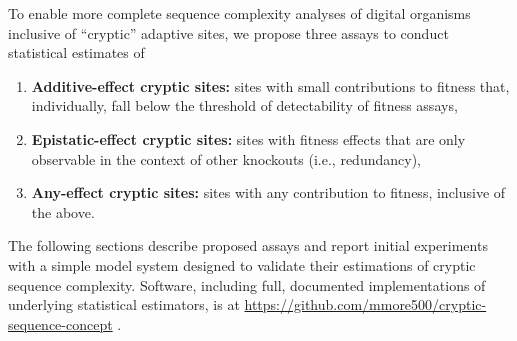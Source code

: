 



To enable more complete sequence complexity analyses of digital organisms inclusive of ``cryptic'' adaptive sites, we propose three assays to conduct statistical estimates of
\begin{enumerate}
\item \textbf{Additive-effect cryptic sites:} sites with small contributions to fitness that, individually, fall below the threshold of detectability of fitness assays,
\item \textbf{Epistatic-effect cryptic sites:} sites with fitness effects that are only observable in the context of other knockouts (i.e., redundancy),
\item \textbf{Any-effect cryptic sites:} sites with any contribution to fitness, inclusive of the above.
\end{enumerate}

The following sections describe proposed assays and report initial experiments with a simple model system designed to validate their estimations of cryptic sequence complexity.
Software, including full, documented implementations of underlying statistical estimators, is at \url{https://github.com/mmore500/cryptic-sequence-concept} \citep{moreno2024cryptic}.
